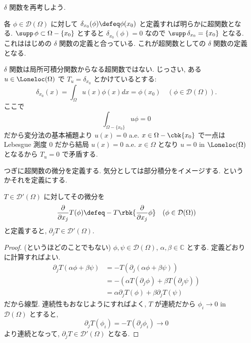 \documentclass[openany, a4paper, oneside]{jsbook}
\begin{document}
$\delta$ 関数を再考しよう.
\begin{ex}
 各 $\phi \in \mathcal{D}(\Omega)$ に対して
 $\delta_{x_0}(\phi) \defeq \phi (x_0)$ と定義すれば明らかに超関数となる.
 $\supp \, \phi \subset \Omega - \{x_0\}$ とすると
 $\delta_{x_0}(\phi) = 0$ なので $\supp \, \delta_{x_0} = \{ x_0 \}$ となる.
 これははじめの $\delta$ 関数の定義と合っている.
 これが超関数としての $\delta$ 関数の定義となる.
\end{ex}
\begin{rem}
 $\delta$ 関数は局所可積分関数からなる超関数ではない.
 じっさい, ある $u \in \Loneloc (\Omega)$ で $T_u = \delta_{x_0}$ とかけているとする:
 \begin{equation}
  \delta_{x_0}(x)
  =
  \int_{\Omega}u (x)\phi (x) dx
  =
  \phi (x_0) \quad (\phi \in \mathcal{D}(\Omega)).
 \end{equation}
 ここで
 \begin{equation}
  \int_{\Omega - \{x_0\}}u\phi
  =
  0
 \end{equation}
 だから変分法の基本補題より $u (x) = 0$ a.e. $x \in \Omega - \cbk{x_0}$ で一点は
 Lebesgue 測度 $0$ だから結局 $u (x) = 0$ a.e. $x \in \Omega$ となり
 $u = 0 $ in $\Loneloc (\Omega)$ となるから $T_u = 0$ で矛盾する.
\end{rem}

つぎに超関数の微分を定義する.
気分としては部分積分をイメージする.
というかそれを定義にする.
\begin{defn}[超関数の微分]
 $T \in \mathcal{D}'(\Omega)$ に対してその微分を
 \begin{equation}
  \frac{\partial}{\partial x_j}T (\phi)
  \defeq
  -T \rbk{\frac{\partial}{\partial x_j}\phi} \quad (\phi \in \mathcal{D}(\Omega))
 \end{equation}
 と定義すると, $\partial_j T \in \mathcal{D}'(\Omega)$.
\end{defn}
\begin{proof}(というほどのことでもない)
$\phi, \psi \in \mathcal{D}(\Omega)$, $\alpha, \beta \in \mathbb{C}$ とする.
定義どおりに計算すればよい.
\begin{equation}
 \begin{split}
  \partial_j T (\alpha \phi + \beta \psi)
  &=
  -T (\partial_j (\alpha \phi + \beta \psi)) \\
  &=
  -(\alpha T (\partial_j\phi) + \beta T (\partial_j\psi)) \\
  &=
  \alpha \partial_jT (\phi) + \beta \partial_jT (\psi)
 \end{split}
\end{equation}
だから線型.
連続性もおなじようにすればよく, $T$ が連続だから $\phi_i \to 0$ in $\mathcal{D}(\Omega)$ とすると,
\begin{equation}
 \partial_jT (\phi_i)
 =
 -T (\partial_j \phi_i) \to 0
\end{equation}
より連続となって, $\partial_j T \in \mathcal{D}'(\Omega)$ となる.
\end{proof}
\end{document}
